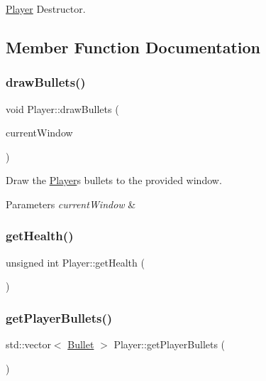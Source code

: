 \hyperlink{class_player}{Player} Destructor. 



\subsection{Member Function Documentation}
\mbox{\label{class_player_aa75798d0eaf3066acc57f6cb3158f0bb}} 
\subsubsection{\texorpdfstring{draw\+Bullets()}{drawBullets()}}
{\footnotesize\ttfamily void Player\+::draw\+Bullets (\begin{DoxyParamCaption}\item[{sf\+::\+Render\+Window $\ast$}]{current\+Window }\end{DoxyParamCaption})}



Draw the \hyperlink{class_player}{Player}\textquotesingle{}s bullets to the provided window. 


\begin{DoxyParams}{Parameters}
{\em current\+Window} & \\
\hline
\end{DoxyParams}
\mbox{\label{class_player_a1f61cee0029ef492d13e289f34e7764b}} 
\subsubsection{\texorpdfstring{get\+Health()}{getHealth()}}
{\footnotesize\ttfamily unsigned int Player\+::get\+Health (\begin{DoxyParamCaption}{ }\end{DoxyParamCaption})\hspace{0.3cm}{\ttfamily [inline]}}

\mbox{\label{class_player_a39c13745f2cd7f6c17be23965b08dfac}} 
\subsubsection{\texorpdfstring{get\+Player\+Bullets()}{getPlayerBullets()}}
{\footnotesize\ttfamily std\+::vector$<$ \hyperlink{class_bullet}{Bullet} $>$ Player\+::get\+Player\+Bullets (\begin{DoxyParamCaption}{ }\end{DoxyParamCaption})}



